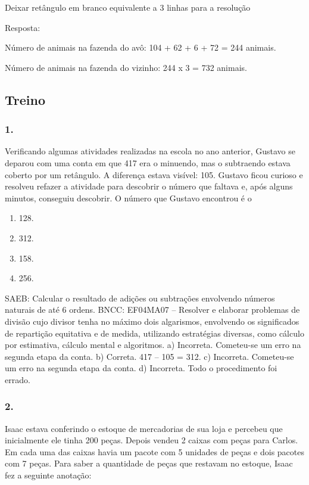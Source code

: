 \begin{enumerate}
\begin{escolha}
Deixar retângulo em branco equivalente a 3 linhas para a resolução

Resposta:

Número de animais na fazenda do avô: 104 + 62 + 6 + 72 = 244 animais.

Número de animais na fazenda do vizinho: 244 x 3 = 732 animais.

\subsection{Treino}\label{treino-1}

\subsubsection{1.}\label{section-23}

Verificando algumas atividades realizadas na escola no ano anterior,
Gustavo se deparou com uma conta em que 417 era o minuendo, mas o subtraendo
estava coberto por um retângulo. A diferença estava visível: 105.
Gustavo ficou curioso e resolveu refazer a atividade para descobrir o
número que faltava e, após alguns minutos, conseguiu descobrir. O número
que Gustavo encontrou é o

\begin{enumerate}
\def\labelenumi{\alph{enumi})}
\item
  128.
\item
  312.
\item
  158.
\item
  256.
\end{enumerate}

SAEB: Calcular o resultado de adições ou subtrações envolvendo números naturais de até 6 ordens.
BNCC: EF04MA07 -- Resolver e elaborar problemas de divisão cujo divisor tenha no máximo dois algarismos,
envolvendo os significados de repartição equitativa e de medida, utilizando estratégias diversas,
como cálculo por estimativa, cálculo mental e algoritmos.
a) Incorreta. Cometeu-se um erro na segunda etapa da conta.
b) Correta. 417 – 105 = 312.
c) Incorreta. Cometeu-se um erro na segunda etapa da conta.
d) Incorreta. Todo o procedimento foi errado.


\subsubsection{2.}\label{section-24}

Isaac estava conferindo o estoque de mercadorias de sua loja e percebeu
que inicialmente ele tinha 200 peças. Depois vendeu 2 caixas com peças
para Carlos. Em cada uma das caixas havia um pacote com 5 unidades de peças e dois
pacotes com 7 peças. Para saber a quantidade de peças que restavam no estoque, Isaac fez a
seguinte anotação:


\end{escolha}
\end{enumerate}
